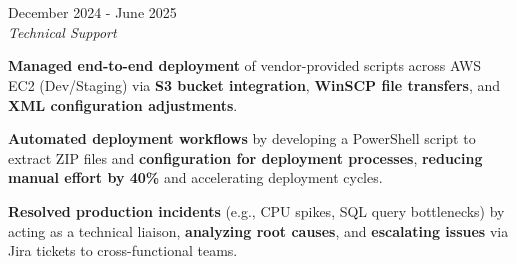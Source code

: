 \documentclass[../main.tex]{subfiles}
\begin{document}
\section{}

\begin{twocolentry}{December 2024 - June 2025}
     \\
    \vspace{0.10 cm}
    \textit{Technical Support}
\end{twocolentry}

\vspace{0.10 cm}
\begin{onecolentry}
\begin{highlights}
    \item \textbf{Managed end-to-end deployment} of vendor-provided scripts across AWS EC2 (Dev/Staging) via \textbf{S3 bucket integration}, \textbf{WinSCP file transfers}, and \textbf{XML configuration adjustments}.
    \item \textbf{Automated deployment workflows} by developing a PowerShell script to extract ZIP files and \textbf{configuration for deployment processes}, \textbf{reducing manual effort by 40\%} and accelerating deployment cycles.
    \item \textbf{Resolved production incidents} (e.g., CPU spikes, SQL query bottlenecks) by acting as a technical liaison, \textbf{analyzing root causes}, and \textbf{escalating issues} via Jira tickets to cross-functional teams.
\end{highlights}
\end{onecolentry}
\end{document}
